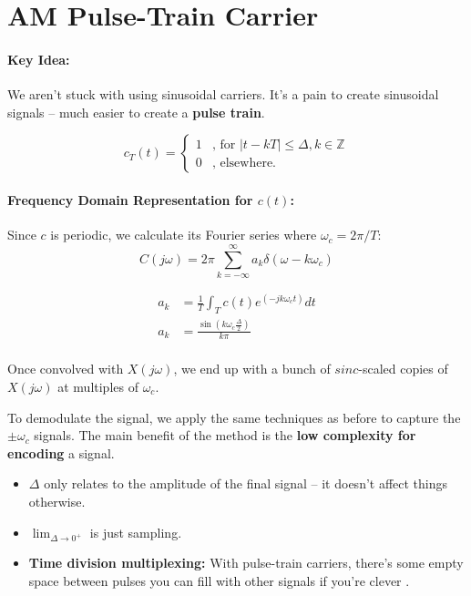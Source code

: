 \documentclass[a4paper,12pt]{report}
\begin{document}
\section{AM Pulse-Train Carrier}

\paragraph{Key Idea: } We aren't stuck with using sinusoidal carriers. It's a pain to create sinusoidal signals -- much easier to create a \textbf{pulse train}.

\begin{equation}
c_T(t) = \begin{cases}
1 & \text{, for } |t-kT| \leq \Delta, k\in \mathbb{Z} \\
0 & \text{, elsewhere.}
\end{cases}
\end{equation}

\paragraph{Frequency Domain Representation for $c(t)$: } Since $c$ is periodic, we calculate its Fourier series where $\omega_c = 2\pi/T$:
\begin{equation}
C(j\omega) = 2\pi \sum_{k=-\infty}^{\infty} a_k \delta(\omega-k\omega_c) 
\end{equation}

\begin{align}
a_k &= \frac{1}{T} \int_{T}^{} c(t) e^{(-jk\omega_c t)} dt \\
a_k &= \frac{\sin(k\omega_c \frac{\Delta}{2})}{k\pi} \\
\end{align}

Once convolved with $X(j\omega)$, we end up with a bunch of $sinc$-scaled copies of $X(j\omega)$ at multiples of $\omega_c$. 

To demodulate the signal, we apply the same techniques as before to capture the $\pm \omega_c$ signals. The main benefit of the method is the \textbf{low complexity for encoding} a signal.

\begin{itemize}
\item $\Delta$ only relates to the amplitude of the final signal -- it doesn't affect things otherwise. 
\item $\lim_{\Delta \to 0^+}$ is just sampling. 
\item \textbf{Time division multiplexing: } With pulse-train carriers, there's some empty space between pulses you can fill with other signals if you're clever .
\end{itemize}
\end{document}

